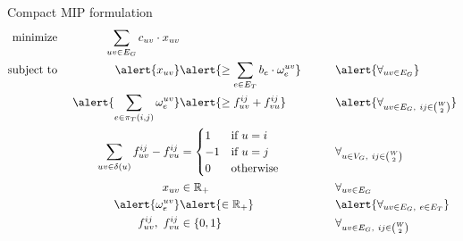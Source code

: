 \documentclass[aspectratio=149]{beamer}
\begin{document}
    \begin{frame}{Compact MIP formulation}
        \vspace*{-2em}
        \begin{alignat*}{5}
            \text{minimize}\ && \sum_{uv \in E_G} c_{uv} \cdot x_{uv} &&& \\
            \text{subject to}\ && \alert{x_{uv}} &\alert{\ge \sum_{e \in E_T} b_e \cdot \omega_e^{uv}} &&\qquad \alert{\forall_{uv \in E_G}} \\
            && \alert{\sum_{e \in \pi_T(i,j)} \omega_e^{uv}} &\alert{\ge f_{uv}^{ij} + f_{vu}^{ij}} &&\qquad \alert{\forall_{uv \in E_G,\ ij \in \binom{W}{2}}} \\
            && \sum_{uv \in \delta(u)} f_{uv}^{ij} - f_{vu}^{ij} &= \begin{cases}
                                         1 & \text{if $u = i$} \\
                                         -1 & \text{if $u = j$} \\
                                         0 & \text{otherwise}
            \end{cases} &&\qquad \forall_{u \in V_G,\ ij \in \binom{W}{2}} \\
            && x_{uv} &\in \mathbb{R}_+ &&\qquad \forall_{uv \in E_G} \\
            && \alert{\omega_e^{uv}} &\alert{\in \mathbb{R}_+} &&\qquad \alert{\forall_{uv \in E_G,\ e \in E_T}} \\
            && f_{uv}^{ij},\ f_{vu}^{ij} &\in \{ 0, 1 \} &&\qquad \forall_{uv \in E_G,\ ij \in \binom{W}{2}}
        \end{alignat*}%
    \end{frame}
\end{document}
